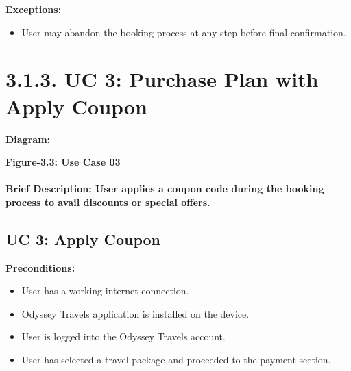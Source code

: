 \documentclass{scrreprt}
\begin{document}
\textbf{Exceptions:}
\begin{itemize}
    \item User may abandon the booking process at any step before final confirmation.
\end{itemize}

\section*{\textbf{3.1.3. UC 3: Purchase Plan with Apply Coupon}}
\textbf{Diagram:}
\newline
\newline
{}
\begin{center}
    \parbox{0.8\textwidth}{ 
        \centering
        \textbf{Figure-3.3: Use Case 03}
    }
\end{center}


\paragraph {\textnormal{Brief Description: 
User applies a coupon code during the booking process to avail discounts or special offers.}}

\subsection*{\textbf{UC 3: Apply Coupon}}

\textbf{Preconditions:}
\begin{itemize}
    \item User has a working internet connection.
    \item Odyssey Travels application is installed on the device.
    \item User is logged into the Odyssey Travels account.
    \item User has selected a travel package and proceeded to the payment section.
\end{itemize}
\end{document}

